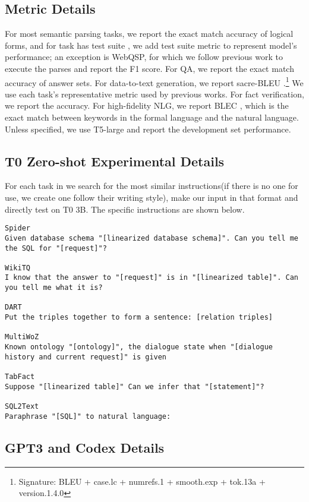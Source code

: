 \documentclass[11pt]{article}
\begin{document}
\subsection{Metric Details}
For most semantic parsing tasks, we report the exact match accuracy of logical forms, and for task has test suite \cite{ruiqi20}, we add test suite metric to represent model's performance; an exception is WebQSP, for which we follow previous work to execute the parses and report the F1 score. 
For QA, we report the exact match accuracy of answer sets. For data-to-text generation, we report sacre-BLEU \cite{post-2018-call}.\footnote{Signature: BLEU + case.lc + numrefs.1 + smooth.exp + tok.13a + version.1.4.0
} 
We use each task's representative metric used by previous works. 
For fact verification, we report the accuracy. For high-fidelity NLG, we report BLEC \cite{shu-etal-2021-logic}, which is the exact match between keywords in the formal language and the natural language. Unless specified, we use T5-large and report the development set performance. 

\subsection{T0 Zero-shot Experimental Details}
\label{subapp:t0_zero}
For each task in \uskg we search \citet{sanh2021multitask} for the most similar instructions(if there is no one for use, we create one follow their writing style), make our input in that format and directly test on T0 3B. The specific instructions are shown below.
\begin{lstlisting}
Spider
Given database schema "[linearized database schema]". Can you tell me the SQL for "[request]"?

WikiTQ
I know that the answer to "[request]" is in "[linearized table]". Can you tell me what it is?

DART
Put the triples together to form a sentence: [relation triples]

MultiWoZ
Known ontology "[ontology]", the dialogue state when "[dialogue history and current request]" is given

TabFact
Suppose "[linearized table]" Can we infer that "[statement]"?

SQL2Text
Paraphrase "[SQL]" to natural language:

\end{lstlisting}

\subsection{GPT3 and Codex Details}
\label{subapp:gpt3_codex}
\end{document}
